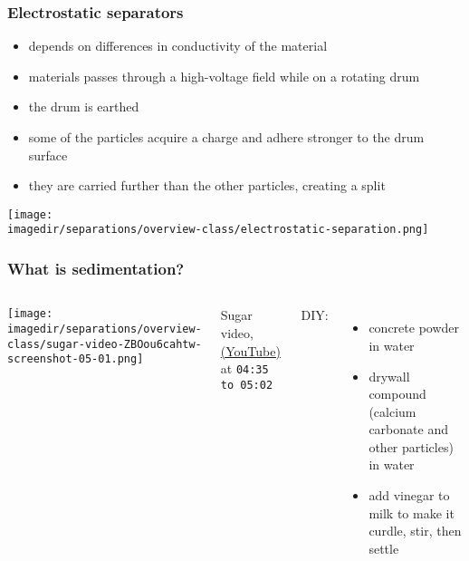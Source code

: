 \begin{frame}\frametitle{{\color{myGreen}{Quick mention:}} Electrostatic separators}

	\begin{itemize}
		\item	depends on differences in conductivity of the material
		\item	materials passes through a high-voltage field while on a rotating drum
		\item	the drum is earthed
		\item	some of the particles acquire a charge and adhere stronger to the drum surface
		\item	they are carried further than the other particles, creating a split
	\end{itemize}

	\begin{center}
		\texttt{[image: \\imagedir/separations/overview-class/electrostatic-separation.png]}
	\end{center}
\end{frame}

\begin{frame}\frametitle{What is sedimentation?}
	\begin{columns}[c]
			\centerline{\texttt{[image: \\imagedir/separations/overview-class/sugar-video-ZBOou6cahtw-screenshot-05-01.png]}}
			
			Sugar video, \href{http://www.youtube.com/watch?v=ZBOou6cahtw}{(YouTube)} at \texttt{04:35 to 05:02}
			
			\vspace{12pt}
			DIY:
			\begin{itemize}
				\item	concrete powder in water
				\item	drywall compound (calcium carbonate and other particles) in water
				\item	add vinegar to milk to make it curdle, stir, then settle
			\end{itemize}
	\end{columns}
\end{frame}

